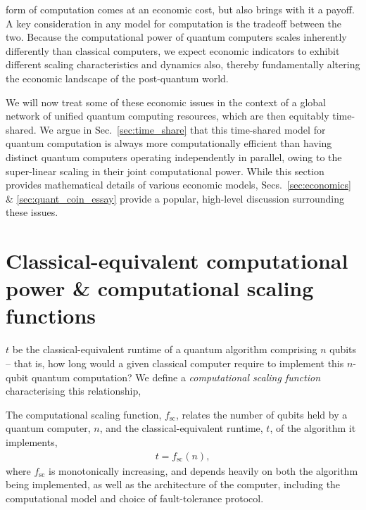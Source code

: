 %
%

 form of computation comes at an economic cost, but also brings with it a payoff. A key consideration in any model for computation is the tradeoff between the two. Because the computational power of quantum computers scales inherently differently than classical computers, we expect economic indicators to exhibit different scaling characteristics and dynamics also, thereby fundamentally altering the economic landscape of the post-quantum world.

We will now treat some of these economic issues in the context of a global network of unified quantum computing resources, which are then equitably time-shared. We argue in Sec.~\ref{sec:time_share} that this time-shared model for quantum computation is always more computationally efficient than having distinct quantum computers operating independently in parallel, owing to the super-linear scaling in their joint computational power. While this section provides mathematical details of various economic models, Secs.~\ref{sec:economics} \& \ref{sec:quant_coin_essay} provide a popular, high-level discussion surrounding these issues.

%
%

\section{Classical-equivalent computational power \& computational scaling functions}\label{sec:comp_sc_func}

 $t$ be the classical-equivalent runtime of a quantum algorithm comprising $n$ qubits -- that is, how long would a given classical computer require to implement this $n$-qubit quantum computation? We define a \textit{computational scaling function} characterising this relationship,

\begin{definition} \label{def:scaling_func} 
The computational scaling function, $f_\mathrm{sc}$, relates the number of qubits held by a quantum computer, $n$, and the classical-equivalent runtime, $t$, of the algorithm it implements,
\begin{align}
t = f_\mathrm{sc}(n),
\end{align}
	where $f_\mathrm{sc}$ is monotonically increasing, and depends heavily on both the algorithm being implemented, as well as the architecture of the computer, including the computational model and choice of fault-tolerance protocol.
\end{definition}

